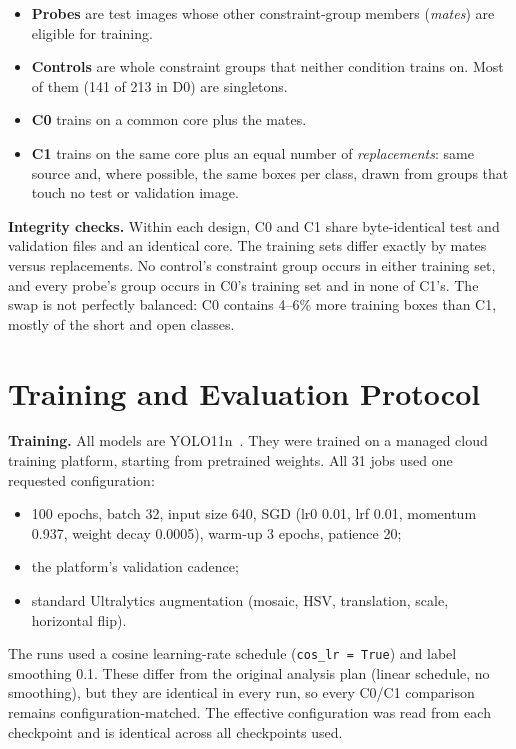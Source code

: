 \documentclass[11pt]{article}
\begin{document}
\begin{itemize}
\item \textbf{Probes} are test images whose other constraint-group members (\emph{mates}) are eligible for training.
\item \textbf{Controls} are whole constraint groups that neither condition trains on. Most of them (141 of 213 in D0) are singletons.
\item \textbf{C0} trains on a common core plus the mates.
\item \textbf{C1} trains on the same core plus an equal number of \emph{replacements}: same source and, where possible, the same boxes per class, drawn from groups that touch no test or validation image.
\end{itemize}
\textbf{Integrity checks.} Within each design, C0 and C1 share byte-identical test and validation files and an identical core. The training sets differ exactly by mates versus replacements. No control's constraint group occurs in either training set, and every probe's group occurs in C0's training set and in none of C1's. The swap is not perfectly balanced: C0 contains 4--6\% more training boxes than C1, mostly of the short and open classes.

\section{Training and Evaluation Protocol}
\textbf{Training.} All models are YOLO11n~\cite{jocher2024yolo11}. They were trained on a managed cloud training platform, starting from pretrained weights. All 31 jobs used one requested configuration:

\begin{itemize}
\item 100 epochs, batch 32, input size 640, SGD (lr0 0.01, lrf 0.01, momentum 0.937, weight decay 0.0005), warm-up 3 epochs, patience 20;
\item the platform's validation cadence;
\item standard Ultralytics augmentation (mosaic, HSV, translation, scale, horizontal flip).
\end{itemize}
The runs used a cosine learning-rate schedule (\texttt{cos\_lr = True}) and label smoothing 0.1. These differ from the original analysis plan (linear schedule, no smoothing), but they are identical in every run, so every C0/C1 comparison remains configuration-matched. The effective configuration was read from each checkpoint and is identical across all checkpoints used.
\end{document}
